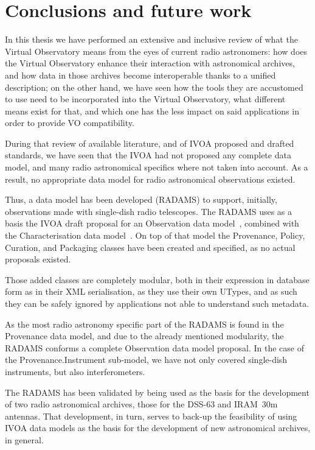 \chapter*[Conclusions and future work]{Conclusions and future work}
\label{conclusions}
	
	In this thesis we have performed an extensive and inclusive
	review of what the Virtual Observatory means from the eyes of
	current radio astronomers: how does the Virtual Observatory
	enhance their interaction with astronomical archives, and how data
	in those archives become interoperable thanks to a unified
	description; on the other hand, we have seen how the tools
	they are accustomed to use need to be incorporated into the
	Virtual Observatory, what different means exist for that,
	and which one has the less impact on said applications
	in order to provide VO compatibility.
	
	During that review of available literature, and of IVOA
	proposed and drafted standards, we have seen that the IVOA
	had not proposed any complete data model, and many radio
	astronomical specifics where not taken into account. As a
	result, no appropriate data model for radio astronomical
	observations existed.
	
	Thus, a data model has been developed (RADAMS) to support,
	initially, observations made with single-dish radio telescopes.
	The RADAMS uses as a basis the IVOA draft proposal for an
	Observation data model~\cite{2005dmo..rept.....M}, combined
	with the Characterisation data model~\cite{2008dmadcrept.....L}.
	On top of that model the Provenance, Policy, Curation, and
	Packaging classes have been created and specified, as no actual
	proposals existed.
	
	Those added classes are completely modular, both in their
	expression in database form as in their XML serialisation,
	as they use their own UTypes, and as such they can be safely
	ignored by applications not able to understand such metadata.
	
	As the most radio astronomy specific part of the RADAMS is
	found in the Provenance data model, and due to the already
	mentioned modularity, the RADAMS conforms a complete Observation
	data model proposal. In the case of the Provenance.Instrument
	sub-model, we have not only covered single-dish instruments,
	but also interferometers.
	
	The RADAMS has been validated by being used as the basis for
	the development of two radio astronomical archives, those for
	the DSS-63 and IRAM~30m antennas. That development, in turn,
	serves to back-up the feasibility of using IVOA data models
	as the basis for the development of new astronomical archives,
	in general.
	
